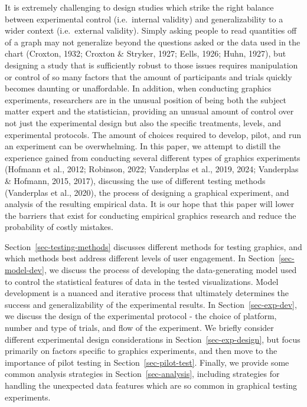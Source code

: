 \documentclass[
  10pt,
]{article}
\begin{document}
It is extremely challenging to design studies which strike the right
balance between experimental control (i.e.~internal validity) and
generalizability to a wider context (i.e.~external validity). Simply
asking people to read quantities off of a graph may not generalize
beyond the questions asked or the data used in the chart (Croxton, 1932;
Croxton \& Stryker, 1927; Eells, 1926; Huhn, 1927), but designing a
study that is sufficiently robust to those issues requires manipulation
or control of so many factors that the amount of participants and trials
quickly becomes daunting or unaffordable. In addition, when conducting
graphics experiments, researchers are in the unusual position of being
both the subject matter expert and the statistician, providing an
unusual amount of control over not just the experimental design but also
the specific treatments, levels, and experimental protocols. The amount
of choices required to develop, pilot, and run an experiment can be
overwhelming. In this paper, we attempt to distill the experience gained
from conducting several different types of graphics experiments (Hofmann
et al., 2012; Robinson, 2022; Vanderplas et al., 2019, 2024; Vanderplas
\& Hofmann, 2015, 2017), discussing the use of different testing methods
(Vanderplas et al., 2020), the process of designing a graphical
experiment, and analysis of the resulting empirical data. It is our hope
that this paper will lower the barriers that exist for conducting
empirical graphics research and reduce the probability of costly
mistakes.

Section~\ref{sec-testing-methods} discusses different methods for
testing graphics, and which methods best address different levels of
user engagement. In Section~\ref{sec-model-dev}, we discuss the process
of developing the data-generating model used to control the statistical
features of data in the tested visualizations. Model development is a
nuanced and iterative process that ultimately determines the success and
generalizability of the experimental results. In
Section~\ref{sec-exp-dev}, we discuss the design of the experimental
protocol - the choice of platform, number and type of trials, and flow
of the experiment. We briefly consider different experimental design
considerations in Section~\ref{sec-exp-design}, but focus primarily on
factors specific to graphics experiments, and then move to the
importance of pilot testing in Section~\ref{sec-pilot-test}. Finally, we
provide some common analysis strategies in Section~\ref{sec-analysis},
including strategies for handling the unexpected data features which are
so common in graphical testing experiments.
\end{document}
